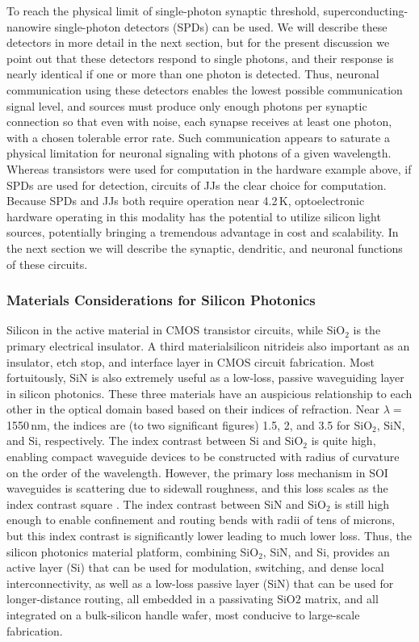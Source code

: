 To reach the physical limit of single-photon synaptic threshold, superconducting-nanowire single-photon detectors (SPDs) can be used. We will describe these detectors in more detail in the next section, but for the present discussion we point out that these detectors respond to single photons, and their response is nearly identical \cite{} if one or more than one photon is detected. Thus, neuronal communication using these detectors enables the lowest possible communication signal level, and sources must produce only enough photons per synaptic connection so that even with noise, each synapse receives at least one photon, with a chosen tolerable error rate. Such communication appears to saturate a physical limitation for neuronal signaling with photons of a given wavelength. Whereas transistors were used for computation in the hardware example above, if SPDs are used for detection, circuits of JJs the clear choice for computation. Because SPDs and JJs both require operation near 4.2\,K, optoelectronic hardware operating in this modality has the potential to utilize silicon light sources, potentially bringing a tremendous advantage in cost and scalability. In the next section we will describe the synaptic, dendritic, and neuronal functions of these circuits. 

\subsubsection{Materials Considerations for Silicon Photonics}
Silicon in the active material in CMOS transistor circuits, while SiO$_2$ is the primary electrical insulator. A third material\textemdash silicon nitride\textemdash is also important as an insulator, etch stop, and interface layer in CMOS circuit fabrication. Most fortuitously, SiN is also extremely useful as a low-loss, passive waveguiding layer in silicon photonics. These three materials have an auspicious relationship to each other in the optical domain based based on their indices of refraction. Near $\lambda =$\,1550\,nm, the indices are (to two significant figures) 1.5, 2, and 3.5 for SiO$_2$, SiN, and Si, respectively. The index contrast between Si and SiO$_2$ is quite high, enabling compact waveguide devices to be constructed with radius of curvature on the order of the wavelength. However, the primary loss mechanism in SOI waveguides is scattering due to sidewall roughness, and this loss scales as the index contrast square \cite{vlmc2004}. The index contrast between SiN and SiO$_2$ is still high enough to enable confinement and routing bends with radii of tens of microns, but this index contrast is significantly lower leading to much lower loss. Thus, the silicon photonics material platform, combining SiO$_2$, SiN, and Si, provides an active layer (Si) that can be used for modulation, switching, and dense local interconnectivity, as well as a low-loss passive layer (SiN) that can be used for longer-distance routing, all embedded in a passivating SiO$2$ matrix, and all integrated on a bulk-silicon handle wafer, most conducive to large-scale fabrication.

